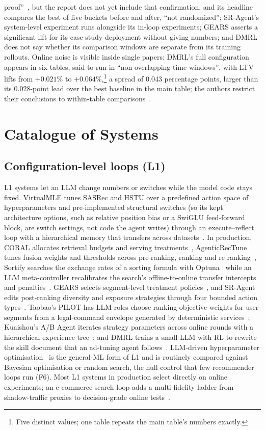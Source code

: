 \documentclass[sigconf,nonacm]{acmart}
\begin{document}
proof''~\cite{pilot2026}, but the report does not yet include that confirmation, and its headline compares the best of
five buckets before and after, ``not randomized''; SR-Agent's system-level experiment runs alongside its in-loop
experiments; GEARS asserts a significant lift for its case-study deployment without giving numbers; and DMRL does not say whether its comparison
windows are separate from its training rollouts. Online noise is visible inside single papers: DMRL's full
configuration appears in six tables, said to run in ``non-overlapping time windows'', with LTV lifts from $+0.021\%$
to $+0.064\%$,\footnote{Five distinct values; one table repeats the main table's numbers exactly.} a spread of 0.043 percentage
points, larger than its 0.028-point lead over the best baseline in the main table; the authors restrict their
conclusions to within-table comparisons~\cite{zhang2026dmrl}.

\section{Catalogue of Systems}\label{app:catalogue}

\subsection{Configuration-level loops (L1)}
L1 systems let an LLM change numbers or switches while the model code stays fixed. VirtualMLE tunes SASRec and HSTU
over a predefined action space of hyperparameters and pre-implemented structural switches (so its kept architecture options, such as relative position bias or a SwiGLU feed-forward block, are switch settings, not code the agent writes) through an execute--reflect loop with a hierarchical memory that transfers across datasets~\cite{cao2026virtualmle}.
In production, CORAL allocates retrieval budgets and serving treatments~\cite{azhar2026coral}, AgenticRecTune tunes
fusion weights and thresholds across pre-ranking, ranking and re-ranking~\cite{wu2026agenticrectune}, Sortify
searches the exchange rates of a sorting formula with Optuna~\cite{akiba2019optuna} while an LLM meta-controller recalibrates the search's
offline-to-online transfer intercepts and penalties~\cite{cheng2026sortify}.
GEARS selects segment-level treatment policies~\cite{yun2026gears}, and SR-Agent edits post-ranking diversity and
exposure strategies through four bounded action types~\cite{yang2026sragent}. Taobao's PILOT has LLM roles choose
ranking-objective weights for user segments from a legal-command envelope generated by deterministic
services~\cite{pilot2026}; Kuaishou's A/B Agent iterates strategy parameters across online rounds with a hierarchical
experience tree~\cite{jiang2026abagent}; and DMRL trains a small LLM with RL to rewrite the skill
document that an ad-tuning agent follows~\cite{zhang2026dmrl}. LLM-driven hyperparameter optimisation~\cite{zhang2023llmhpo,liu2024agenthpo} is the general-ML form of L1 and is
routinely compared against Bayesian optimisation or random search, the null control that few recommender loops run
(F6). Most L1 systems in production select directly on online experiments; an e-commerce search loop adds a multi-fidelity ladder from shadow-traffic proxies to
decision-grade online tests~\cite{wang2026pear}.
\end{document}

